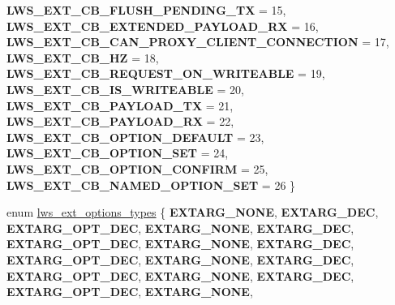 \begin{DoxyCompactItemize}
{\bfseries L\+W\+S\+\_\+\+E\+X\+T\+\_\+\+C\+B\+\_\+\+F\+L\+U\+S\+H\+\_\+\+P\+E\+N\+D\+I\+N\+G\+\_\+\+TX} = 15, 
{\bfseries L\+W\+S\+\_\+\+E\+X\+T\+\_\+\+C\+B\+\_\+\+E\+X\+T\+E\+N\+D\+E\+D\+\_\+\+P\+A\+Y\+L\+O\+A\+D\+\_\+\+RX} = 16, 
\newline
{\bfseries L\+W\+S\+\_\+\+E\+X\+T\+\_\+\+C\+B\+\_\+\+C\+A\+N\+\_\+\+P\+R\+O\+X\+Y\+\_\+\+C\+L\+I\+E\+N\+T\+\_\+\+C\+O\+N\+N\+E\+C\+T\+I\+ON} = 17, 
{\bfseries L\+W\+S\+\_\+\+E\+X\+T\+\_\+\+C\+B\+\_\+HZ} = 18, 
{\bfseries L\+W\+S\+\_\+\+E\+X\+T\+\_\+\+C\+B\+\_\+\+R\+E\+Q\+U\+E\+S\+T\+\_\+\+O\+N\+\_\+\+W\+R\+I\+T\+E\+A\+B\+LE} = 19, 
{\bfseries L\+W\+S\+\_\+\+E\+X\+T\+\_\+\+C\+B\+\_\+\+I\+S\+\_\+\+W\+R\+I\+T\+E\+A\+B\+LE} = 20, 
\newline
{\bfseries L\+W\+S\+\_\+\+E\+X\+T\+\_\+\+C\+B\+\_\+\+P\+A\+Y\+L\+O\+A\+D\+\_\+\+TX} = 21, 
{\bfseries L\+W\+S\+\_\+\+E\+X\+T\+\_\+\+C\+B\+\_\+\+P\+A\+Y\+L\+O\+A\+D\+\_\+\+RX} = 22, 
{\bfseries L\+W\+S\+\_\+\+E\+X\+T\+\_\+\+C\+B\+\_\+\+O\+P\+T\+I\+O\+N\+\_\+\+D\+E\+F\+A\+U\+LT} = 23, 
{\bfseries L\+W\+S\+\_\+\+E\+X\+T\+\_\+\+C\+B\+\_\+\+O\+P\+T\+I\+O\+N\+\_\+\+S\+ET} = 24, 
\newline
{\bfseries L\+W\+S\+\_\+\+E\+X\+T\+\_\+\+C\+B\+\_\+\+O\+P\+T\+I\+O\+N\+\_\+\+C\+O\+N\+F\+I\+RM} = 25, 
{\bfseries L\+W\+S\+\_\+\+E\+X\+T\+\_\+\+C\+B\+\_\+\+N\+A\+M\+E\+D\+\_\+\+O\+P\+T\+I\+O\+N\+\_\+\+S\+ET} = 26
 \}
\item 
enum \hyperlink{group__extensions_gacc9f55936dc165257a2e1f7d47bce89e}{lws\+\_\+ext\+\_\+options\+\_\+types} \{ \newline
{\bfseries E\+X\+T\+A\+R\+G\+\_\+\+N\+O\+NE}, 
{\bfseries E\+X\+T\+A\+R\+G\+\_\+\+D\+EC}, 
{\bfseries E\+X\+T\+A\+R\+G\+\_\+\+O\+P\+T\+\_\+\+D\+EC}, 
{\bfseries E\+X\+T\+A\+R\+G\+\_\+\+N\+O\+NE}, 
\newline
{\bfseries E\+X\+T\+A\+R\+G\+\_\+\+D\+EC}, 
{\bfseries E\+X\+T\+A\+R\+G\+\_\+\+O\+P\+T\+\_\+\+D\+EC}, 
{\bfseries E\+X\+T\+A\+R\+G\+\_\+\+N\+O\+NE}, 
{\bfseries E\+X\+T\+A\+R\+G\+\_\+\+D\+EC}, 
\newline
{\bfseries E\+X\+T\+A\+R\+G\+\_\+\+O\+P\+T\+\_\+\+D\+EC}, 
{\bfseries E\+X\+T\+A\+R\+G\+\_\+\+N\+O\+NE}, 
{\bfseries E\+X\+T\+A\+R\+G\+\_\+\+D\+EC}, 
{\bfseries E\+X\+T\+A\+R\+G\+\_\+\+O\+P\+T\+\_\+\+D\+EC}, 
\newline
{\bfseries E\+X\+T\+A\+R\+G\+\_\+\+N\+O\+NE}, 
{\bfseries E\+X\+T\+A\+R\+G\+\_\+\+D\+EC}, 
{\bfseries E\+X\+T\+A\+R\+G\+\_\+\+O\+P\+T\+\_\+\+D\+EC}, 
{\bfseries E\+X\+T\+A\+R\+G\+\_\+\+N\+O\+NE}, 
\newline

\end{DoxyCompactItemize}

